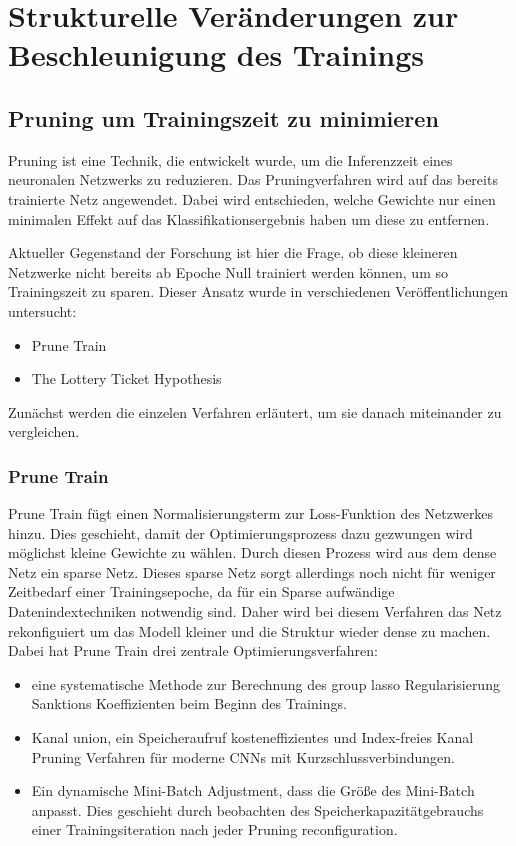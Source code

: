 \section{Strukturelle Veränderungen zur Beschleunigung des Trainings}

\subsection{Pruning um Trainingszeit zu minimieren}
Pruning ist eine Technik, die entwickelt wurde, um die Inferenzzeit eines neuronalen Netzwerks zu reduzieren. Das Pruningverfahren wird auf das bereits trainierte Netz angewendet. Dabei wird entschieden, welche Gewichte nur einen minimalen Effekt auf das Klassifikationsergebnis haben um diese zu entfernen.

Aktueller Gegenstand der Forschung ist hier die Frage, ob diese kleineren Netzwerke nicht bereits ab Epoche Null trainiert werden können, um so Trainingszeit zu sparen. Dieser Ansatz wurde in verschiedenen Veröffentlichungen untersucht:
\begin{itemize}
 \item Prune Train 
 \item The Lottery Ticket Hypothesis
\end{itemize}
Zunächst werden die einzelen Verfahren erläutert, um sie danach miteinander zu vergleichen.

\subsubsection{Prune Train}
Prune Train fügt einen Normalisierungsterm zur Loss-Funktion des Netzwerkes hinzu. Dies geschieht, damit der Optimierungsprozess dazu gezwungen wird möglichst kleine Gewichte zu wählen. Durch diesen Prozess wird aus dem dense Netz ein sparse Netz. Dieses sparse Netz sorgt allerdings noch nicht für weniger Zeitbedarf einer Trainingsepoche, da für ein Sparse aufwändige Datenindextechniken notwendig sind. Daher wird bei diesem Verfahren das Netz rekonfiguiert um das Modell kleiner und die Struktur wieder dense zu machen.
Dabei hat Prune Train drei zentrale Optimierungsverfahren:
\begin{itemize}
   \item eine systematische Methode zur Berechnung des group lasso Regularisierung Sanktions Koeffizienten beim Beginn des Trainings.
   \item Kanal union, ein Speicheraufruf kosteneffizientes und Index-freies Kanal Pruning Verfahren für moderne CNNs mit Kurzschlussverbindungen.
   \item Ein dynamische Mini-Batch Adjustment, dass die Größe des Mini-Batch anpasst. Dies geschieht durch beobachten des Speicherkapazitätgebrauchs einer Trainingsiteration nach jeder Pruning reconfiguration.
\end{itemize} 

